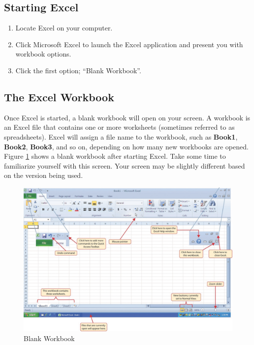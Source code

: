 \subsection{Starting Excel}

\begin{enumerate}
	\item Locate Excel on your computer.
	\item Click Microsoft Excel to launch the Excel application and present you with workbook options.
	\item Click the first option; “Blank Workbook”.
\end{enumerate}

\subsection{The Excel Workbook}

Once Excel is started, a blank workbook will open on your screen. A workbook is an Excel file that contains one or more worksheets (sometimes referred to as spreadsheets). Excel will assign a file name to the workbook, such as \textbf{Book1}, \textbf{Book2}, \textbf{Book3}, and so on, depending on how many new workbooks are opened. Figure \ref{01:fig02} shows a blank workbook after starting Excel. Take some time to familiarize yourself with this screen. Your screen may be slightly different based on the version being used.

\begin{figure}[H]
	\centering
	\includegraphics[width=\maxwidth{.95\linewidth}]{gfx/ch01_fig02}
	\caption{Blank Workbook}
	\label{01:fig02}
\end{figure}

